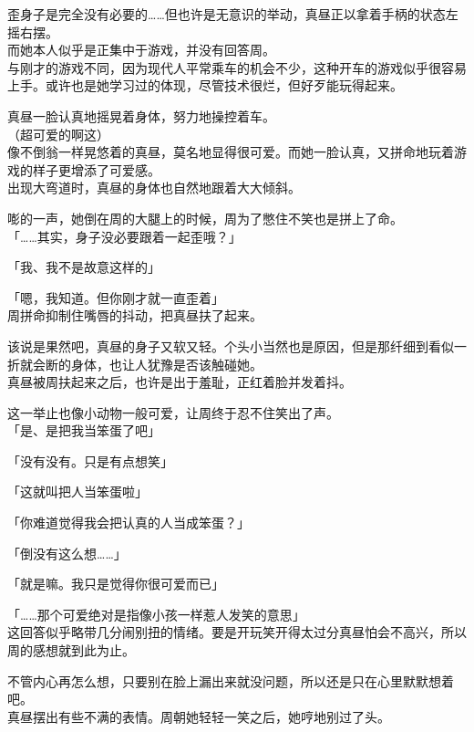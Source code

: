 歪身子是完全没有必要的……但也许是无意识的举动，真昼正以拿着手柄的状态左摇右摆。\\

而她本人似乎是正集中于游戏，并没有回答周。\\

与刚才的游戏不同，因为现代人平常乘车的机会不少，这种开车的游戏似乎很容易上手。或许也是她学习过的体现，尽管技术很烂，但好歹能玩得起来。

真昼一脸认真地摇晃着身体，努力地操控着车。\\

（超可爱的啊这）\\

像不倒翁一样晃悠着的真昼，莫名地显得很可爱。而她一脸认真，又拼命地玩着游戏的样子更增添了可爱感。\\

出现大弯道时，真昼的身体也自然地跟着大大倾斜。

嘭的一声，她倒在周的大腿上的时候，周为了憋住不笑也是拼上了命。\\

「……其实，身子没必要跟着一起歪哦？」

「我、我不是故意这样的」

「嗯，我知道。但你刚才就一直歪着」\\

周拼命抑制住嘴唇的抖动，把真昼扶了起来。

该说是果然吧，真昼的身子又软又轻。个头小当然也是原因，但是那纤细到看似一折就会断的身体，也让人犹豫是否该触碰她。\\

真昼被周扶起来之后，也许是出于羞耻，正红着脸并发着抖。

这一举止也像小动物一般可爱，让周终于忍不住笑出了声。\\

「是、是把我当笨蛋了吧」

「没有没有。只是有点想笑」

「这就叫把人当笨蛋啦」

「你难道觉得我会把认真的人当成笨蛋？」

「倒没有这么想……」

「就是嘛。我只是觉得你很可爱而已」

「……那个可爱绝对是指像小孩一样惹人发笑的意思」\\

这回答似乎略带几分闹别扭的情绪。要是开玩笑开得太过分真昼怕会不高兴，所以周的感想就到此为止。

不管内心再怎么想，只要别在脸上漏出来就没问题，所以还是只在心里默默想着吧。\\

真昼摆出有些不满的表情。周朝她轻轻一笑之后，她哼地别过了头。
